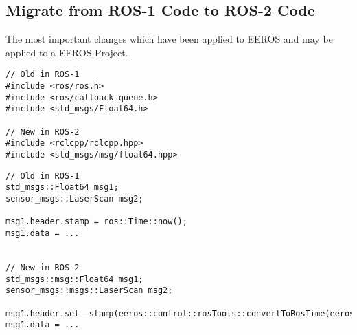 \subsection[ROS-Migration]{Migrate from ROS-1 Code to ROS-2 Code} \label{sec:cpp-api-ros1-to-ros2}

The most important changes which have been applied to EEROS and may be applied to a EEROS-Project.

\lstset{language=[ISO]C++}
\begin{lstlisting}[label=code:cpp-api-includes, caption={[Includes]The includes changed from ros.h (plus some others) to mainly only rclcpp/rclcpp.hpp. The messages are now in a subfolder and lowercase.}]
// Old in ROS-1
#include <ros/ros.h>
#include <ros/callback_queue.h>
#include <std_msgs/Float64.h>

// New in ROS-2
#include <rclcpp/rclcpp.hpp>
#include <std_msgs/msg/float64.hpp>
\end{lstlisting}


\lstset{language=[ISO]C++}
\begin{lstlisting}[label=code:cpp-api-messages, caption={[Messages]Messages in ROS-2 are more Object-Oriented and are located in the namespace \textit{msgs}.}]
// Old in ROS-1
std_msgs::Float64 msg1;
sensor_msgs::LaserScan msg2;

msg1.header.stamp = ros::Time::now();
msg1.data = ...


// New in ROS-2
std_msgs::msg::Float64 msg1;
sensor_msgs::msgs::LaserScan msg2;

msg1.header.set__stamp(eeros::control::rosTools::convertToRosTime(eeros::System::getTimeNs()));
msg1.data = ...
\end{lstlisting}


